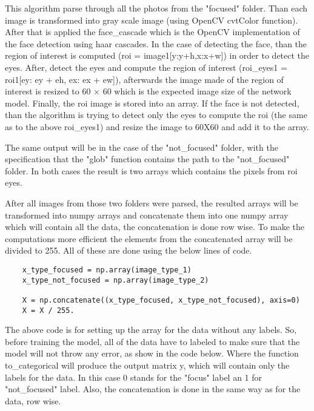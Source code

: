 This algorithm parse through all the photos from the "focused" folder. Than each image is transformed into gray scale image (using OpenCV cvtColor function). After that is applied the face\_cascade which is the OpenCV implementation of the face detection using haar cascades. In the case of detecting the face, than the region of interest is computed (roi = image1[y:y+h,x:x+w]) in order to detect the eyes. After, detect the eyes and compute the region of interest (roi\_eyes1 = roi1[ey: ey + eh, ex: ex + ew]), afterwards the image made of the region of interest is resized to 60 $\times$ 60 which is the expected image size of the network model. Finally, the roi image is stored into an array. If the face is not detected, than the algorithm is trying to detect only the eyes to compute the roi (the same as to the above roi\_eyes1) and resize the image to 60X60 and add it to the array.\par

The same output will be in the case of the "not\_focused" folder, with the specification that the "glob" function contains the path to the "not\_focused" folder. In both cases the result is two arrays which contains the pixels from roi eyes. \par

After all images from those two folders were parsed, the resulted arrays will be transformed into numpy arrays and concatenate them into one numpy array which will contain all the data, the concatenation is done row wise. To make the computations more efficient the elements from the concatenated array will be divided to 255. All of these are done using the below lines of code. 

\begin{lstlisting}
    x_type_focused = np.array(image_type_1)
    x_type_not_focused = np.array(image_type_2)
    
    X = np.concatenate((x_type_focused, x_type_not_focused), axis=0)
    X = X / 255.
\end{lstlisting}

The above code is for setting up the array for the data without any labels. So, before training the model, all of the data have to labeled to make sure that the model will not throw any error, as show in the code below. Where the function to\_categorical will produce the output matrix y, which will contain only the labels for the data. In this case 0 stands for the "focus" label an 1 for "not\_focused" label. Also, the concatenation is done in the same way as for the data, row wise.

